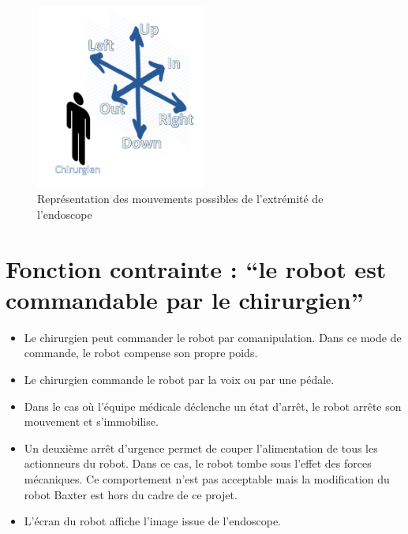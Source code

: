 \documentclass[oneside, DIV=11]{scrreprt}
\begin{document}
\begin{figure}[h]
\centering
\includegraphics[width=0.50\textwidth]{./img/schema.png}
\caption{Représentation des mouvements possibles de l'extrémité de l'endoscope}
\label{mouvements}
\end{figure}



\section{Fonction contrainte : “le robot est commandable par le chirurgien”}

\begin{itemize}
 \item Le chirurgien peut commander le robot par comanipulation. Dans ce mode de commande, le robot compense son propre poids.
 \item Le chirurgien commande le robot par la voix ou par une pédale.
 \item Dans le cas où l'équipe médicale déclenche un état d'arrêt, le robot arrête son mouvement et s'immobilise.
 \item Un deuxième arrêt d'urgence permet de couper l'alimentation de tous les actionneurs du robot. Dans ce cas, le robot tombe sous l'effet des forces mécaniques. Ce comportement n'est pas acceptable mais la modification du robot Baxter est hors du cadre de ce projet.
 \item L'écran du robot affiche l'image issue de l'endoscope.
\end{itemize}
\end{document}
